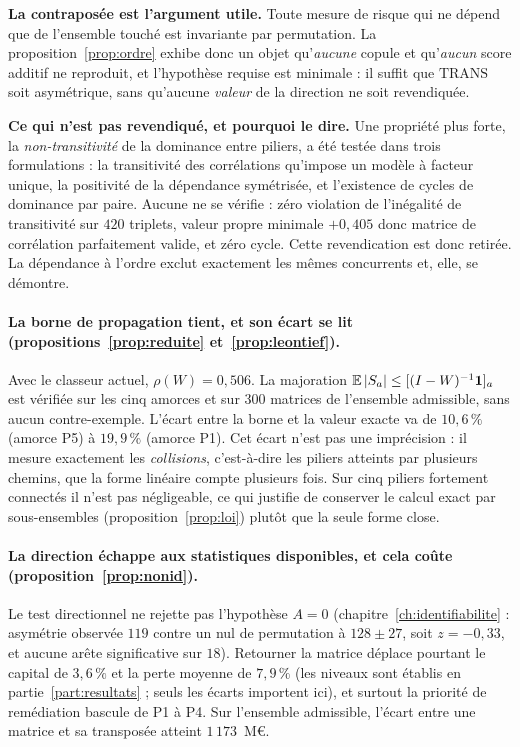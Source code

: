 \begin{cle}
\textbf{La contraposée est l'argument utile.} Toute mesure de risque qui ne dépend que de
l'ensemble touché est invariante par permutation. La proposition~\ref{prop:ordre} exhibe donc un
objet qu'\emph{aucune} copule et qu'\emph{aucun} score additif ne reproduit, et l'hypothèse
requise est minimale : il suffit que $\mathrm{TRANS}$ soit asymétrique, sans qu'aucune
\emph{valeur} de la direction ne soit revendiquée.
\end{cle}

\begin{cle}
\textbf{Ce qui n'est pas revendiqué, et pourquoi le dire.} Une propriété plus forte, la
\emph{non-transitivité} de la dominance entre piliers, a été testée dans trois formulations :
la transitivité des corrélations qu'impose un modèle à facteur unique, la positivité de la
dépendance symétrisée, et l'existence de cycles de dominance par paire. Aucune ne se
vérifie : zéro violation de l'inégalité de transitivité sur $420$ triplets, valeur propre
minimale $+0{,}405$ donc matrice de corrélation parfaitement valide, et zéro cycle. Cette
revendication est donc retirée. La dépendance à l'ordre exclut exactement les mêmes
concurrents et, elle, se démontre.
\end{cle}

\paragraph{La borne de propagation tient, et son écart se lit (propositions~\ref{prop:reduite}
et~\ref{prop:leontief}).} Avec le classeur actuel, $\rho(W)=0{,}506$. La majoration
$\mathbb{E}\,|S_a|\le[(I-W)^{-1}\mathbf 1]_a$ est vérifiée sur les cinq amorces et sur $300$ matrices de
l'ensemble admissible, sans aucun contre-exemple. L'écart entre la borne et la valeur exacte va
de $10{,}6\,\%$ (amorce P5) à $19{,}9\,\%$ (amorce P1). Cet écart n'est pas une
imprécision : il mesure exactement les \emph{collisions}, c'est-à-dire les piliers atteints par
plusieurs chemins, que la forme linéaire compte plusieurs fois. Sur cinq piliers fortement
connectés il n'est pas négligeable, ce qui justifie de conserver le calcul exact par
sous-ensembles (proposition~\ref{prop:loi}) plutôt que la seule forme close.

\paragraph{La direction échappe aux statistiques disponibles, et cela coûte
(proposition~\ref{prop:nonid}).} Le test directionnel ne rejette pas l'hypothèse $A=0$
(chapitre~\ref{ch:identifiabilite} : asymétrie observée $119$ contre un nul de permutation à
$128 \pm 27$, soit $z=-0{,}33$, et aucune arête significative sur $18$). Retourner la matrice
déplace pourtant le capital de $3{,}6\,\%$ et la perte moyenne de $7{,}9\,\%$ (les niveaux sont
établis en partie~\ref{part:resultats} ; seuls les écarts importent ici), et surtout la priorité
de remédiation bascule de P1 à P4. Sur l'ensemble admissible, l'écart entre une matrice et sa
transposée atteint $1\,173$~M\euro{}.

